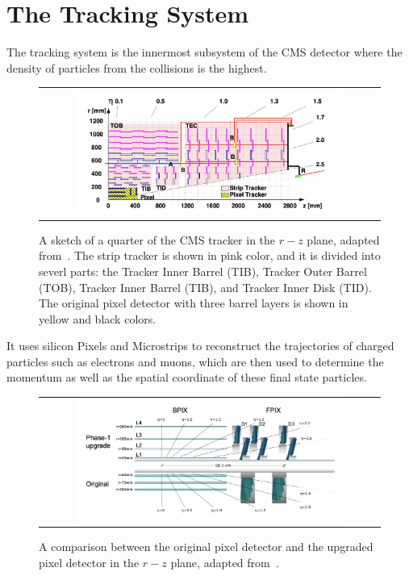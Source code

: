\section{The Tracking System}
\label{sec:TK}

The tracking system is the innermost subsystem of the \ac{CMS} detector where the density of particles from the collisions is the highest. 

\begin{figure}[tbh!]
 \begin{center}
 \begin{tabular}{c}
 \includegraphics[width=0.8\textwidth]{figures/Part2/CMS/Tracker}
 \end{tabular}
 \caption{A sketch of a quarter of the \ac{CMS} tracker in the $r-z$ plane, adapted from~\cite{CMS:2009dvy}. The strip tracker is shown in pink color, and it is divided into severl parts: the Tracker Inner Barrel (TIB), Tracker Outer Barrel (TOB), Tracker Inner Barrel (TIB), and Tracker Inner Disk (TID). The original pixel detector with three barrel layers is shown in yellow and black colors.}
 \label{fig:Tracker}
 \end{center}
\end{figure}


It uses silicon Pixels and Microstrips to reconstruct the trajectories of charged particles such as electrons and muons, which are then used to determine the momentum as well as the spatial coordinate of these final state particles.

\begin{figure}[tbh!]
 \begin{center}
 \begin{tabular}{c}
 \includegraphics[width=0.8\textwidth]{figures/Part2/CMS/Pixel}
 \end{tabular}
 \caption{A comparison between the original pixel detector and the upgraded pixel detector in the $r-z$ plane, adapted from~\cite{CMSTrackerGroup:2020edz}.}
 \label{fig:Pixel}
 \end{center}
\end{figure}


